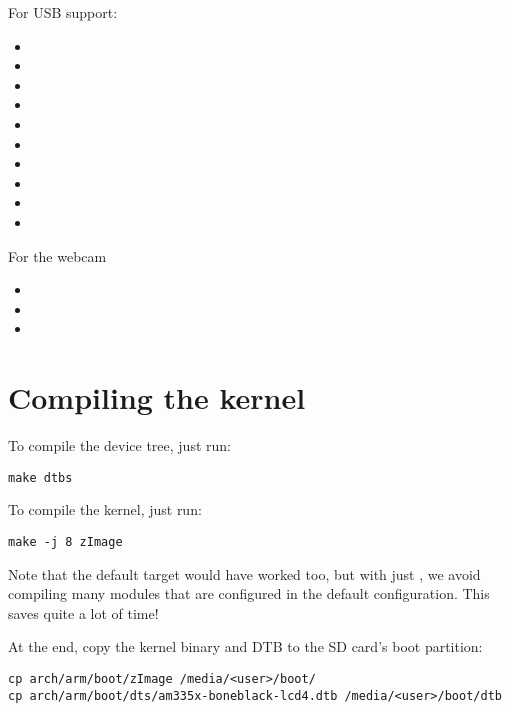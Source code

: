 For USB support:
\begin{itemize}
\item {} 
\item {}
\item {}
\item {}
\item {}
\item {}
\item {}
\item {}
\item {}
\item {}
\end{itemize}

For the webcam
\begin{itemize}
\item {} 
\item {}
\item {}
\end{itemize}

\section{Compiling the kernel}

To compile the device tree, just run:
\begin{verbatim}
make dtbs
\end{verbatim}

To compile the kernel, just run:
\begin{verbatim}
make -j 8 zImage
\end{verbatim}

Note that the default  target would have worked too, but with
just , we avoid compiling many modules that are configured
in the default configuration. This saves quite a lot of time!

At the end, copy the kernel binary and DTB to the SD card's boot
partition:

\begin{verbatim}
cp arch/arm/boot/zImage /media/<user>/boot/
cp arch/arm/boot/dts/am335x-boneblack-lcd4.dtb /media/<user>/boot/dtb
\end{verbatim}

